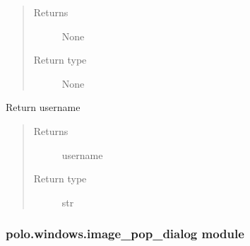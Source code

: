 \documentclass[letterpaper,10pt,english]{sphinxmanual}
\begin{document}
\begin{fulllineitems}
\begin{fulllineitems}
\begin{quote}
\begin{description}
\item[{Returns}] \leavevmode
None

\item[{Return type}] \leavevmode
None

\end{description}\end{quote}

\end{fulllineitems}


\begin{fulllineitems}
\label{\detokenize{polo.windows:polo.windows.ftp_dialog.FTPDialog.username}}
Return username
\begin{quote}\begin{description}
\item[{Returns}] \leavevmode
username

\item[{Return type}] \leavevmode
str

\end{description}\end{quote}

\end{fulllineitems}


\end{fulllineitems}



\subsubsection{polo.windows.image\_pop\_dialog module}
\label{\detokenize{polo.windows:module-polo.windows.image_pop_dialog}}\label{\detokenize{polo.windows:polo-windows-image-pop-dialog-module}}
\end{document}
